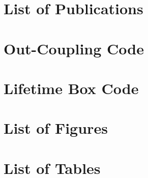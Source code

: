 \documentclass{article}
\begin{document}
\newcommand{\mainfile}{} 


\newpage


\newpage


\newpage


\newpage


\newpage


\newpage


\newpage



\newpage


\newpage


\newpage


\newpage


\newpage


\newpage


\newpage



\newpage

\appendix
\appendixpage
\addappheadtotoc

\section{List of Publications}

\newpage

\section{Out-Coupling Code}
\newpage

\section{Lifetime Box Code}
\newpage

\section{List of Figures}
\listoffigures
\newpage

\section{List of Tables}
\listoftables
\newpage
\end{document}
